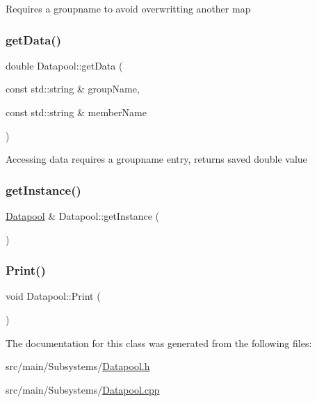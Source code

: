 Requires a groupname to avoid overwritting another map \mbox{\label{classDatapool_a005421262c8c1a71fa93d167492ebb50}} 
\subsubsection{\texorpdfstring{get\+Data()}{getData()}}
{\footnotesize\ttfamily double Datapool\+::get\+Data (\begin{DoxyParamCaption}\item[{const std\+::string \&}]{group\+Name,  }\item[{const std\+::string \&}]{member\+Name }\end{DoxyParamCaption})}

Accessing data requires a groupname entry, returns saved double value \mbox{\label{classDatapool_a9cfbb881291c80d851d0df66341b6299}} 
\subsubsection{\texorpdfstring{get\+Instance()}{getInstance()}}
{\footnotesize\ttfamily \hyperlink{classDatapool}{Datapool} \& Datapool\+::get\+Instance (\begin{DoxyParamCaption}{ }\end{DoxyParamCaption})\hspace{0.3cm}{\ttfamily [static]}}

\mbox{\label{classDatapool_afae02fe80bca3b1978317f2f7be8bec1}} 
\subsubsection{\texorpdfstring{Print()}{Print()}}
{\footnotesize\ttfamily void Datapool\+::\+Print (\begin{DoxyParamCaption}{ }\end{DoxyParamCaption})}



The documentation for this class was generated from the following files\+:\begin{DoxyCompactItemize}
\item 
src/main/\+Subsystems/\hyperlink{Datapool_8h}{Datapool.\+h}\item 
src/main/\+Subsystems/\hyperlink{Datapool_8cpp}{Datapool.\+cpp}\end{DoxyCompactItemize}
